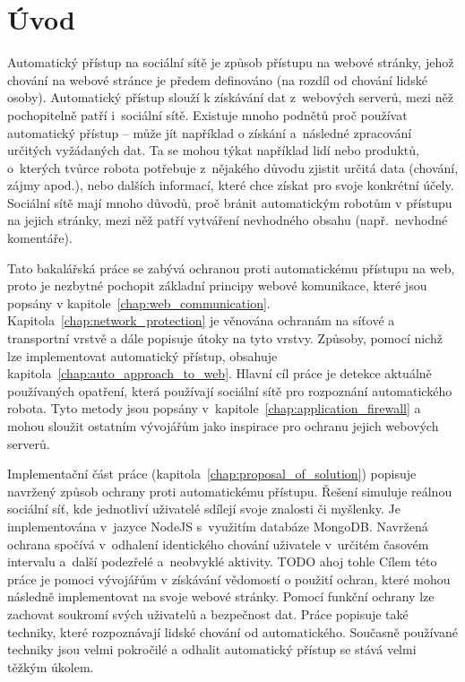 \chapter{Úvod}

Automatický přístup na sociální sítě je způsob přístupu na webové stránky, jehož chování na webové stránce je předem definováno (na rozdíl od chování lidské osoby). Automatický přístup slouží k získávání dat z~webových serverů, mezi něž pochopitelně patří i~sociální sítě. Existuje mnoho podnětů proč používat automatický přístup -- může jít například o získání a~následné zpracování určitých vyžádaných dat. Ta se mohou týkat například lidí nebo produktů, o~kterých tvůrce robota potřebuje z~nějakého důvodu zjistit určitá data (chování, zájmy apod.), nebo dalších informací, které chce získat pro svoje konkrétní účely. Sociální sítě mají mnoho důvodů, proč bránit automatickým robotům v přístupu na jejich stránky, mezi něž patří vytváření nevhodného obsahu (např.~nevhodné komentáře).

Tato bakalářská práce se zabývá ochranou proti automatickému přístupu na web, proto je nezbytné pochopit základní principy webové komunikace, které jsou popsány v kapitole~\ref{chap:web_communication}. Kapitola~\ref{chap:network_protection} je věnována ochranám na síťové a transportní vrstvě a dále popisuje útoky na tyto vrstvy. Způsoby, pomocí nichž lze implementovat automatický přístup, obsahuje kapitola~\ref{chap:auto_approach_to_web}. Hlavní cíl práce je detekce aktuálně používaných opatření, která používají sociální sítě pro rozpoznání automatického robota. Tyto metody jsou popsány v~kapitole~\ref{chap:application_firewall} a mohou sloužit ostatním vývojářům jako inspirace pro ochranu jejich webových serverů. 

Implementační část práce (kapitola~\ref{chap:proposal_of_solution}) popisuje navržený způsob ochrany proti automatickému přístupu. Řešení simuluje reálnou sociální síť, kde jednotliví uživatelé sdílejí svoje znalosti či myšlenky. Je implementována v~jazyce NodeJS s~využitím databáze MongoDB. Navržená ochrana spočívá v~odhalení identického chování uživatele v~určitém časovém intervalu a~další podezřelé a~neobvyklé aktivity. 
TODO ahoj tohle
Cílem této práce je pomoci vývojářům v získávání vědomostí o použití ochran, které mohou následně implementovat na svoje webové stránky. Pomocí funkční ochrany lze zachovat soukromí svých uživatelů a bezpečnost dat. Práce popisuje také techniky, které rozpoznávají lidské chování od automatického. Současně používané techniky jsou velmi pokročilé a odhalit automatický přístup se stává velmi těžkým úkolem.

